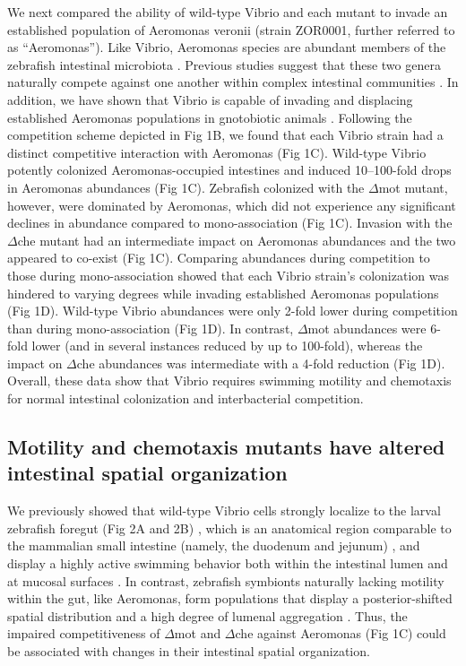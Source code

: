 We next compared the ability of wild-type Vibrio and each mutant to invade an established population of Aeromonas veronii (strain ZOR0001, further referred to as ``Aeromonas''). Like Vibrio, Aeromonas species are abundant members of the zebrafish intestinal microbiota \cite{stephens_composition_2016}. Previous studies suggest that these two genera naturally compete against one another within complex intestinal communities \cite{phelps_microbial_2017}. In addition, we have shown that Vibrio is capable of invading and displacing established Aeromonas populations in gnotobiotic animals \cite{wiles_host_2016}. Following the competition scheme depicted in Fig 1B, we found that each Vibrio strain had a distinct competitive interaction with Aeromonas (Fig 1C). Wild-type Vibrio potently colonized Aeromonas-occupied intestines and induced 10–100-fold drops in Aeromonas abundances (Fig 1C). Zebrafish colonized with the $\Delta$mot mutant, however, were dominated by Aeromonas, which did not experience any significant declines in abundance compared to mono-association (Fig 1C). Invasion with the $\Delta$che mutant had an intermediate impact on Aeromonas abundances and the two appeared to co-exist (Fig 1C). Comparing abundances during competition to those during mono-association showed that each Vibrio strain's colonization was hindered to varying degrees while invading established Aeromonas populations (Fig 1D). Wild-type Vibrio abundances were only 2-fold lower during competition than during mono-association (Fig 1D). In contrast, $\Delta$mot abundances were 6-fold lower (and in several instances reduced by up to 100-fold), whereas the impact on $\Delta$che abundances was intermediate with a 4-fold reduction (Fig 1D). Overall, these data show that Vibrio requires swimming motility and chemotaxis for normal intestinal colonization and interbacterial competition.


\subsection{Motility and chemotaxis mutants have altered intestinal spatial organization}
We previously showed that wild-type Vibrio cells strongly localize to the larval zebrafish foregut (Fig 2A and 2B) \cite{schlomann_bacterial_2018}, which is an anatomical region comparable to the mammalian small intestine (namely, the duodenum and jejunum) \cite{lickwar_genomic_2017,wang_morphological_2010}, and display a highly active swimming behavior both within the intestinal lumen and at mucosal surfaces \cite{wiles_host_2016}. In contrast, zebrafish symbionts naturally lacking motility within the gut, like Aeromonas, form populations that display a posterior-shifted spatial distribution and a high degree of lumenal aggregation \cite{schlomann_bacterial_2018,wiles_host_2016}. Thus, the impaired competitiveness of $\Delta$mot and $\Delta$che against Aeromonas (Fig 1C) could be associated with changes in their intestinal spatial organization. 

